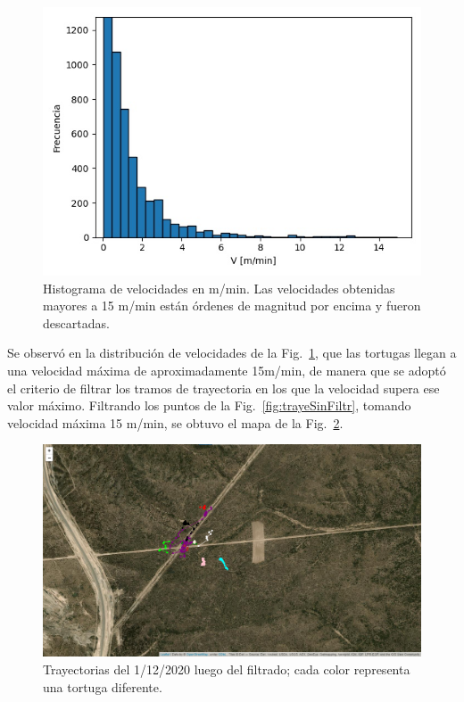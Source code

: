  
\begin{figure}[ht]
\begin{center}
       
   
    \includegraphics[width=1.2\imsize]{Chap2/Velocidades3.jpeg}
    \caption[Distribución de velocidades.]{Histograma de velocidades en m/min. Las  velocidades obtenidas mayores a 15 m/min están órdenes de magnitud por encima y fueron descartadas.}%
    \label{fig:distribuciondeVel}
\end{center}
\end{figure}
Se observó en la distribución de velocidades de la Fig.~\ref{fig:distribuciondeVel}, que las tortugas llegan a una velocidad máxima de aproximadamente 15m/min, de manera que se adoptó el criterio de filtrar los tramos de trayectoria en los que la velocidad supera ese valor máximo. Filtrando los puntos de la Fig.~\ref{fig:trayeSinFiltr}, tomando velocidad máxima 15 m/min, se obtuvo  el mapa de la Fig.~\ref{fig:trayeConFiltr}.
 
 
 
 
\begin{figure}[ht]
    \begin{center}
       
   
    \includegraphics[width=\imsize]{Chap2/Traye1_12_conF.png}
\end{center}
    \caption[Trayectorias un dia de medición, después del filtrado.]{Trayectorias del 1/12/2020 luego del filtrado; cada color representa una tortuga diferente.}
    \label{fig:trayeConFiltr}
\end{figure}
 

